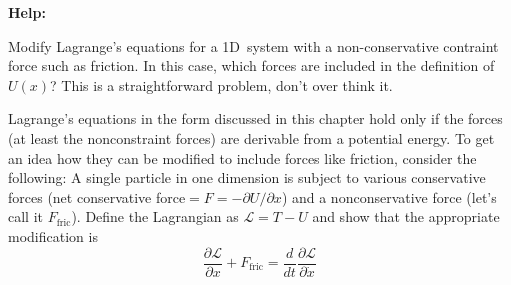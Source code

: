 \documentclass[11pt,letterpaper,boxed]{../hmcpset}
\begin{document}
\textbf{Help:}

\begin{problem}[i]
Modify Lagrange's equations for a 1D~system with a non-conservative contraint force such as friction. 
In this case, which forces are included in the definition of $U(x)$? 
This is a straightforward problem, don't over think it.

\begin{problem}[7.12] 
Lagrange's equations in the form discussed in this chapter hold only if the forces (at least the nonconstraint forces) are derivable from a potential energy. 
To get an idea how they can be modified to include forces like friction, consider the following: 
A single particle in one dimension is subject to various conservative forces (net conservative force$= F = - \partial U / \partial x$) and a nonconservative force (let's call it $F_\text{fric}$). 
Define the Lagrangian as $\mathcal{L} = T - U$ and show that the appropriate modification is 
  \[ \frac{\partial \mathcal{L}}{\partial x} + F_\text{fric} = \frac{d}{dt} \frac{\partial \mathcal{L}}{\partial \dot x} \]
\end{problem}
\end{problem}

\begin{solution}

\vfill
\end{solution}

\newpage 
\end{document}

